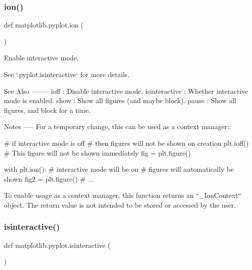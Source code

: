 \subsubsection{\texorpdfstring{ion()}{ion()}}
{\footnotesize\ttfamily def matplotlib.\+pyplot.\+ion (\begin{DoxyParamCaption}{ }\end{DoxyParamCaption})}

\begin{DoxyVerb}Enable interactive mode.

See `.pyplot.isinteractive` for more details.

See Also
--------
ioff : Disable interactive mode.
isinteractive : Whether interactive mode is enabled.
show : Show all figures (and maybe block).
pause : Show all figures, and block for a time.

Notes
-----
For a temporary change, this can be used as a context manager::

    # if interactive mode is off
    # then figures will not be shown on creation
    plt.ioff()
    # This figure will not be shown immediately
    fig = plt.figure()

    with plt.ion():
        # interactive mode will be on
        # figures will automatically be shown
        fig2 = plt.figure()
        # ...

To enable usage as a context manager, this function returns an
``_IonContext`` object. The return value is not intended to be stored
or accessed by the user.
\end{DoxyVerb}
 \mbox{\label{namespacematplotlib_1_1pyplot_ae7d45bb4117c9cd8b5a80b5a56178fd7}} 
\subsubsection{\texorpdfstring{isinteractive()}{isinteractive()}}
{\footnotesize\ttfamily def matplotlib.\+pyplot.\+isinteractive (\begin{DoxyParamCaption}{ }\end{DoxyParamCaption})}

